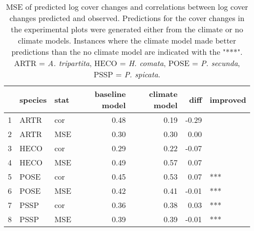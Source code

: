 \begin{table}[H]
\centering
\caption{MSE of predicted log cover changes and correlations between log cover changes predicted and observed. Predictions for the cover changes in the experimental plots were generated either from the climate or no climate models. Instances where the climate model made better predictions than the no climate model are indicated with the "***". ARTR = \textit{A. tripartita}, HECO = \textit{H. comata}, POSE = \textit{P. secunda}, PSSP = \textit{P. spicata}.} 
\label{table:corPGR}
\begin{tabular}{rllrrrl}
  \hline
 & species & stat & baseline model & climate model & diff & improved \\ 
  \hline
1 & ARTR & cor & 0.48 & 0.19 & -0.29 &  \\ 
  2 & ARTR & MSE & 0.30 & 0.30 & 0.00 &  \\ 
  3 & HECO & cor & 0.29 & 0.22 & -0.07 &  \\ 
  4 & HECO & MSE & 0.49 & 0.57 & 0.07 &  \\ 
  5 & POSE & cor & 0.45 & 0.53 & 0.07 & *** \\ 
  6 & POSE & MSE & 0.42 & 0.41 & -0.01 & *** \\ 
  7 & PSSP & cor & 0.36 & 0.38 & 0.03 & *** \\ 
  8 & PSSP & MSE & 0.39 & 0.39 & -0.01 & *** \\ 
   \hline
\end{tabular}
\end{table}
